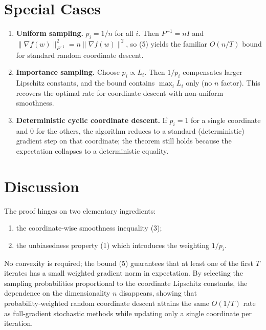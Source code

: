 \documentclass{article}
\begin{document}
\section*{Special Cases}
\begin{enumerate}[leftmargin=*]
\item \textbf{Uniform sampling.} $p_i=1/n$ for all $i$.
Then $P^{-1}=nI$ and $\|\nabla f(w)\|_{P^{-1}}^{2}=n\|\nabla f(w)\|^{2}$,
so (5) yields the familiar $O(n/T)$ bound for standard random
coordinate descent.

\item \textbf{Importance sampling.} Choose $p_i\propto L_i$.
Then $1/p_i$ compensates larger Lipschitz constants, and the bound
contains $\max_i L_i$ only (no $n$ factor).  This recovers the optimal
rate for coordinate descent with non‑uniform smoothness.

\item \textbf{Deterministic cyclic coordinate descent.}
If $p_i=1$ for a single coordinate and $0$ for the others, the
algorithm reduces to a standard (deterministic) gradient step on that
coordinate; the theorem still holds because the expectation collapses
to a deterministic equality.
\end{enumerate}

\section*{Discussion}
The proof hinges on two elementary ingredients:
\begin{enumerate}[label=\roman*)]
\item the coordinate‑wise smoothness inequality (3);
\item the unbiasedness property (1) which introduces the weighting $1/p_i$.
\end{enumerate}
No convexity is required; the bound (5) guarantees that at least one of
the first $T$ iterates has a small weighted gradient norm in expectation.
By selecting the sampling probabilities proportional to the coordinate
Lipschitz constants, the dependence on the dimensionality $n$ disappears,
showing that probability‑weighted random coordinate descent attains the
same $O(1/T)$ rate as full‑gradient stochastic methods while updating only a
single coordinate per iteration.
\end{document}
